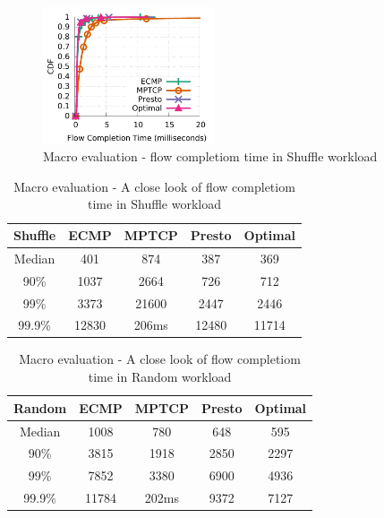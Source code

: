 \begin{figure}[!t]
        \centering
  \includegraphics[width=0.45\textwidth]{presto/figures/macro/shuffle/macro_compare_fct_shuffle_mice.pdf}
        \caption{Macro evaluation - flow completiom time in Shuffle workload}
        \label{macro_evaluation_fct_shuffle}
\end{figure}

\fi

\iffalse
\begin{table}[!htb]
\begin{center}
\begin{tabular}{ |c|c|c|c|c| } 
 \hline
 Shuffle & ECMP & MPTCP & Presto & Optimal \\
 \hline 
 Median & 401 & 874 & 387 & 369  \\ 
 90\%   & 1037 & 2664 & 726 & 712 \\
 99\%   & 3373 & 21600  & 2447 & 2446 \\ 
 99.9\% & 12830 & 206ms & 12480 & 11714 \\
 \hline

\end{tabular}
\caption{Macro evaluation - A close look of flow completiom time in Shuffle workload}
        \label{macro_evaluation_fct_shuffle_closelook}
\end{center}
\end{table}

\begin{table}[!htb]
\begin{center}
\begin{tabular}{ |c|c|c|c|c| }
 \hline
 Random & ECMP & MPTCP & Presto & Optimal \\
 \hline
 Median & 1008 & 780 & 648 & 595  \\
 90\%   & 3815 & 1918 & 2850 & 2297 \\
 99\%   & 7852 & 3380  & 6900 & 4936 \\
 99.9\% & 11784 & 202ms & 9372 & 7127 \\
 \hline

\end{tabular}
\caption{Macro evaluation - A close look of flow completiom time in Random workload}
        \label{macro_evaluation_fct_random_closelook}
\end{center}
\end{table}

